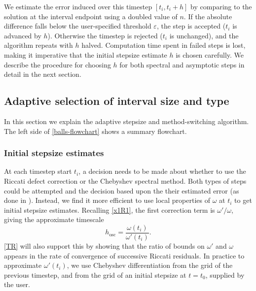 \documentclass[10pt]{article}
\newcommand{\be}{\begin{equation}}
\newcommand{\ee}{\end{equation}}
\newcommand{\om}{\omega}
\begin{document}
We estimate the error induced over this timestep $[t_i,t_i+h]$
by comparing to the solution at the interval endpoint using a doubled value
of $n$.
If the
absolute
difference falls below the user-specified
threshold $\varepsilon$, the step is accepted ($t_i$ is advanced by $h$).
Otherwise the timestep is rejected ($t_i$ is unchanged), and the algorithm
repeats with $h$ halved.
Computation time spent in failed steps is lost, making
it imperative that the initial stepsize estimate $h$ is chosen carefully. We
describe the procedure for choosing $h$ for both spectral and asymptotic steps
in detail in the next section.



\subsection{Adaptive selection of interval size and type}
\label{adap}

In this section we explain the adaptive stepsize and method-switching
algorithm. The left side of \cref{balls-flowchart} shows
a summary flowchart.

\subsubsection{Initial stepsize estimates}
\label{hosc}

At each timestep start $t_i$, a decision needs to be made about whether to
use the Riccati defect correction or the Chebyshev spectral method.
Both types of steps could be attempted
and the decision based upon the their estimated error (as done in \cite{agocs2020efficient}).
Instead, we find it more efficient to use local properties of $\om$ at $t_i$
to get initial stepsize estimates.
Recalling \cref{x1R1}, the first correction term is $\om'/\om$, giving the
approximate timescale
\be\label{hoscini}
h_{\text{osc}} = \frac{\om(t_i)}{\om'(t_i)}.
\ee
\cref{TR} will also support this by showing that
the ratio of bounds on $\om'$ and $\om$ appears in the rate of
convergence of successive Riccati residuals.
In practice to approximate $\om'(t_i)$, we use Chebyshev differentiation
from the grid of the previous timestep, and from the grid of an initial
stepsize at $t=t_0$, supplied by the user.
\end{document}
